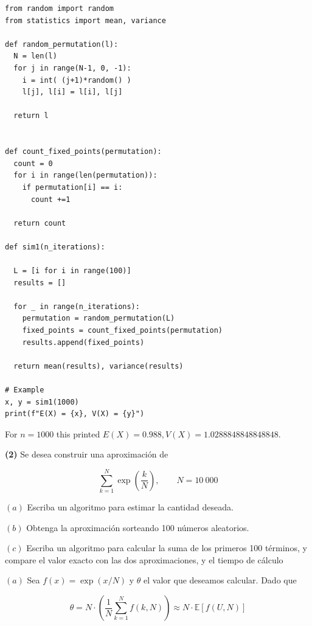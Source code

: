 \documentclass[a4paper, 12pt]{article}
\begin{document}
\small
\begin{verbatim}
from random import random
from statistics import mean, variance

def random_permutation(l):
  N = len(l)
  for j in range(N-1, 0, -1):
    i = int( (j+1)*random() )
    l[j], l[i] = l[i], l[j]

  return l


def count_fixed_points(permutation):
  count = 0
  for i in range(len(permutation)):
    if permutation[i] == i:
      count +=1

  return count

def sim1(n_iterations):

  L = [i for i in range(100)]
  results = []

  for _ in range(n_iterations):
    permutation = random_permutation(L)
    fixed_points = count_fixed_points(permutation)
    results.append(fixed_points)

  return mean(results), variance(results)

# Example
x, y = sim1(1000)
print(f"E(X) = {x}, V(X) = {y}")
\end{verbatim}

\normalsize
For $n = 1000$ this printed $E(X) = 0.988, V(X) = 1.0288848848848848$.

\pagebreak

\begin{myframe}
  \textbf{(2)} Se desea construir una aproximación de 

  \begin{equation*}
    \sum_{k=1}^N \exp\left( \frac{k}{N} \right), \qquad N = 10 ~ 000
  \end{equation*}

$(a)$ Escriba un algoritmo para estimar la cantidad deseada.

$(b)$ Obtenga la aproximación sorteando 100 números aleatorios.

$(c)$ Escriba un algoritmo para calcular la suma de los primeros 100 términos, y
compare el valor exacto con las dos aproximaciones, y el tiempo de cálculo
\end{myframe}

$(a)$ Sea $f(x) = \exp(x / N)$ y $\theta$ el valor que deseamos
calcular. Dado que 

\begin{equation*}
  \theta = N \cdot \left( \frac{1}{N}\sum_{k=1}^N f(k, N) \right) \approx N
  \cdot \mathbb{E}\left[ f(U, N) \right] 
\end{equation*}
\end{document}
